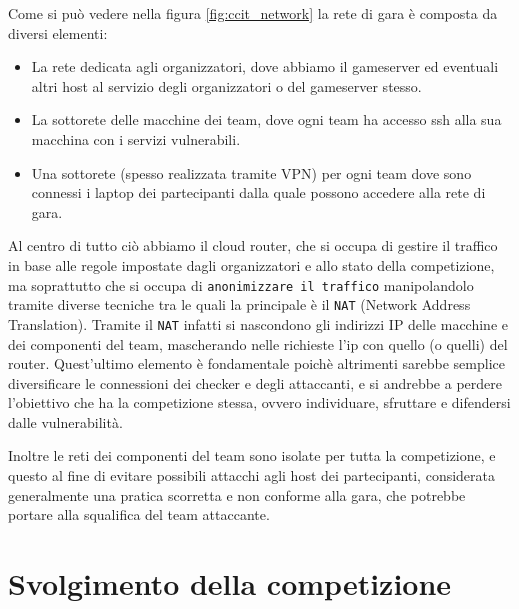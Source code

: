 Come si può vedere nella figura \ref{fig:ccit_network} la rete di gara è composta da diversi elementi:
\begin{itemize}
    \setlength{\itemsep}{5pt}
    \setlength{\parskip}{5pt}
    \item La rete dedicata agli organizzatori, dove abbiamo il gameserver ed eventuali altri host al servizio degli organizzatori o del gameserver stesso.
    \item La sottorete delle macchine dei team, dove ogni team ha accesso ssh alla sua macchina con i servizi vulnerabili.
    \item Una sottorete (spesso realizzata tramite VPN) per ogni team dove sono connessi i laptop dei partecipanti dalla quale possono accedere alla rete di gara.
\end{itemize}

Al centro di tutto ciò abbiamo il cloud router, che si occupa di gestire il traffico in base alle regole impostate dagli organizzatori e allo stato della competizione, ma
soprattutto che si occupa di \texttt{anonimizzare il traffico} manipolandolo tramite diverse tecniche tra le quali la principale è il \texttt{NAT} (Network Address Translation).
Tramite il \texttt{NAT} infatti si nascondono gli indirizzi IP delle macchine e dei componenti del team, mascherando nelle richieste l'ip con quello (o quelli) del router.
Quest'ultimo elemento è fondamentale poichè altrimenti sarebbe semplice diversificare le connessioni dei checker e degli attaccanti, e si andrebbe a perdere l'obiettivo che ha
la competizione stessa, ovvero individuare, sfruttare e difendersi dalle vulnerabilità.

Inoltre le reti dei componenti del team sono isolate per tutta la competizione, e questo al fine di evitare possibili attacchi agli host dei partecipanti,
considerata generalmente una pratica scorretta e non conforme alla gara, che potrebbe portare alla squalifica del team attaccante.

\section{Svolgimento della competizione}

